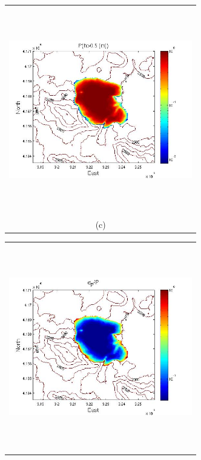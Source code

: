 \documentclass[12pt]{article}
\newcommand{\Pic}[2][0.85]{\begin{center}\texttt{[image: \#2]}
 \end{center} }
\begin{document}
\begin{figure}[H]
\begin{minipage}{0.6\textwidth}
\begin{tabular}{c}
        \end{tabular}
    \end{minipage} 
        \begin{minipage}[b]{0.6\textwidth}
        \begin{tabular}{c}
       \includegraphics[width=8cm,height=9cm,keepaspectratio]{figs/Mammoth_3_P_5m.jpg}\\
        (c)
        \end{tabular}
    \end{minipage}
    \begin{minipage}{0.6\textwidth}
        \begin{tabular}{c}
	\includegraphics[width=8cm,height=9cm,keepaspectratio]{figs/Mammoth_3_sigma_5m.jpg}\\

\end{tabular}
\end{minipage}
\end{figure}
\end{document}
